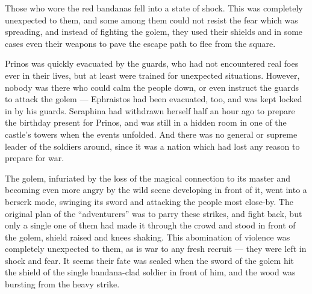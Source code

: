 Those who wore the red bandanas fell into a state of shock. This was completely unexpected to them, and some among them could not resist the fear which was spreading, and instead of fighting the golem, they used their shields and in some cases even their weapons to pave the escape path to flee from the square.

Prinos was quickly evacuated by the guards, who had not encountered real foes ever in their lives, but at least were trained for unexpected situations. However, nobody was there who could calm the people down, or even instruct the guards to attack the golem --- Ephraistos had been evacuated, too, and was kept locked in by his guards. Seraphina had withdrawn herself half an hour ago to prepare the birthday present for Prinos, and was still in a hidden room in one of the castle's towers when the events unfolded. And there was no general or supreme leader of the soldiers around, since it was a nation which had lost any reason to prepare for war.

The golem, infuriated by the loss of the magical connection to its master and becoming even more angry by the wild scene developing in front of it, went into a berserk mode, swinging its sword and attacking the people most close-by. The original plan of the \enquote{adventurers} was to parry these strikes, and fight back, but only a single one of them had made it through the crowd and stood in front of the golem, shield raised and knees shaking. This abomination of violence was completely unexpected to them, as is war to any fresh recruit --- they were left in shock and fear. It seems their fate was sealed when the sword of the golem hit the shield of the single bandana-clad soldier in front of him, and the wood was bursting from the heavy strike.

